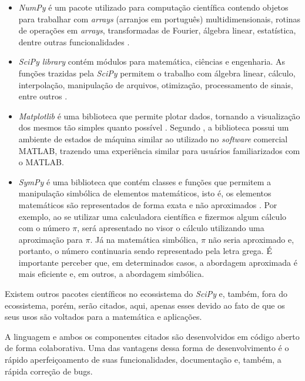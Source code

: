 \documentclass[
	12pt,				%
	openright,			%
    twoside,			%
	a4paper,			%
	english,			%
	french,				%
	spanish,			%
	brazil				%
	]{abntex2}
\numberwithin{lema}{chapter}
\numberwithin{teorema}{chapter}
\numberwithin{definicao}{chapter}
\numberwithin{exemplo}{chapter}
\numberwithin{figure}{chapter}
\begin{document}
\begin{itemize}
	\item {}\textit{NumPy} é um pacote utilizado para computação científica contendo objetos para trabalhar com \textit{arrays} (arranjos em português) multidimensionais, rotinas de operações em \textit{arrays}, transformadas de Fourier, álgebra linear, estatística, dentre outras funcionalidades \cite{NumPy}.
	
	\item {}\textit{SciPy library} contém módulos para matemática, ciências e engenharia. As funções trazidas pela \textit{SciPy} permitem o trabalho com álgebra linear, cálculo, interpolação, manipulação de arquivos, otimização, processamento de sinais, entre outros \cite{SciPy}.
	
	\item {}\textit{Matplotlib} é uma biblioteca que permite plotar dados, tornando a visualização dos mesmos tão simples quanto possível \cite{Matplotlib}. Segundo , a biblioteca possui um ambiente de estados de máquina similar ao utilizado no \textit{software} comercial MATLAB, trazendo uma experiência similar para usuários familiarizados com o MATLAB.
	
	\item {}\textit{SymPy} é uma biblioteca que contém classes e funções que permitem a manipulação simbólica de elementos matemáticos, isto é, os elementos matemáticos são representados de forma exata e não aproximados \cite{SymPy}. Por exemplo, ao se utilizar uma calculadora científica e fizermos algum cálculo com o número $\pi$, será apresentado no visor o cálculo utilizando uma aproximação para $\pi$. Já na matemática simbólica, $\pi$ não seria aproximado e, portanto, o número continuaria sendo representado pela letra grega. É importante perceber que, em determinados casos, a abordagem aproximada é mais eficiente e, em outros, a abordagem simbólica.
\end{itemize}

Existem outros pacotes científicos no ecossistema do \textit{SciPy} e, também, fora do ecossistema, porém, serão citados, aqui, apenas esses devido ao fato de que os seus usos são voltados para a matemática e aplicações.

A linguagem e ambos os componentes citados são desenvolvidos em código aberto de forma colaborativa. Uma das vantagens dessa forma de desenvolvimento é o rápido aperfeiçoamento de suas funcionalidades, documentação e, também, a rápida correção de bugs.
\end{document}
